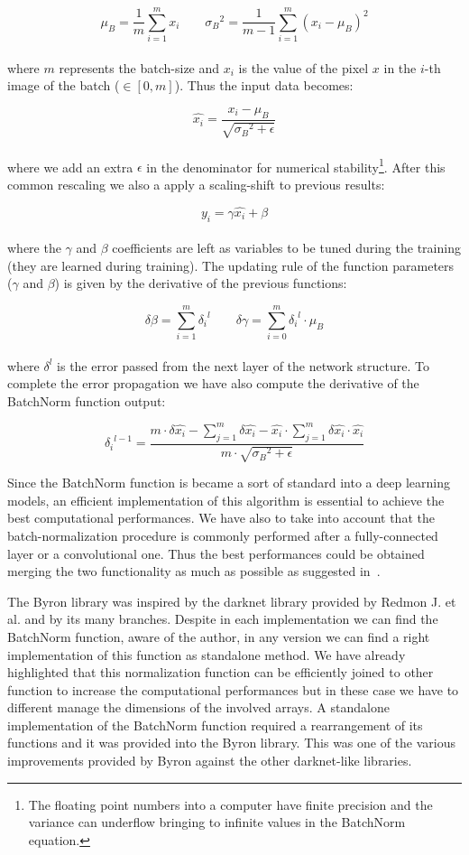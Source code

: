 \documentclass{standalone}
\begin{document}
$$
\mu_B = \frac{1}{m}\sum_{i=1}^{m}x_i \quad\quad {\sigma_B}^2 = \frac{1}{m-1}\sum_{i=1}^{m}(x_i - \mu_B)^2
$$
\\
where $m$ represents the batch-size and $x_i$ is the value of the pixel $x$ in the $i$-th image of the batch ($\in[0, m]$).
Thus the input data becomes:

$$
\hat{x_i} = \frac{x_i - \mu_B}{\sqrt{{\sigma_B}^2 + \epsilon}}
$$
\\
where we add an extra $\epsilon$ in the denominator for numerical stability\footnote{
  The floating point numbers into a computer have finite precision and the variance can underflow bringing to infinite values in the BatchNorm equation.
}.
After this common rescaling we also a apply a scaling-shift to previous results:

$$
y_i = \gamma\hat{x_i} + \beta
$$
\\
where the $\gamma$ and $\beta$ coefficients are left as variables to be tuned during the training (they are learned during training).
The updating rule of the function parameters ($\gamma$ and $\beta$) is given by the derivative of the previous functions:

$$
\delta\beta = \sum_{i=1}^{m}{\delta_i}^l \quad\quad \delta\gamma = \sum_{i=0}^{m} {\delta_i}^l \cdot \mu_B
$$
\\
where $\delta^l$ is the error passed from the next layer of the network structure.
To complete the error propagation we have also compute the derivative of the BatchNorm function output:

$$
{\delta_i}^{l-1} = \frac{{m}\cdot \delta\hat{x_i} - \sum_{j=1}^{m}\delta\hat{x_i} - \hat{x_i} \cdot \sum_{j=1}^{m} \delta\hat{x_i} \cdot \hat{x_i}}{m \cdot \sqrt{{\sigma_B}^2 + \epsilon} }
$$

Since the BatchNorm function is became a sort of standard into a deep learning models, an efficient implementation of this algorithm is essential to achieve the best computational performances.
We have also to take into account that the batch-normalization procedure is commonly performed after a fully-connected layer or a convolutional one.
Thus the best performances could be obtained merging the two functionality as much as possible as suggested in~\cite{AlexeyAB}.

The \textsf{Byron} library was inspired by the \textsf{darknet} library provided by Redmon J. et al. and by its many branches.
Despite in each implementation we can find the BatchNorm function, aware of the author, in any version we can find a right implementation of this function as standalone method.
We have already highlighted that this normalization function can be efficiently joined to other function to increase the computational performances but in these case we have to different manage the dimensions of the involved arrays.
A standalone implementation of the BatchNorm function required a rearrangement of its functions and it was provided into the \textsf{Byron} library.
This was one of the various improvements provided by \textsf{Byron} against the other \textsf{darknet}-like libraries.
\end{document}
